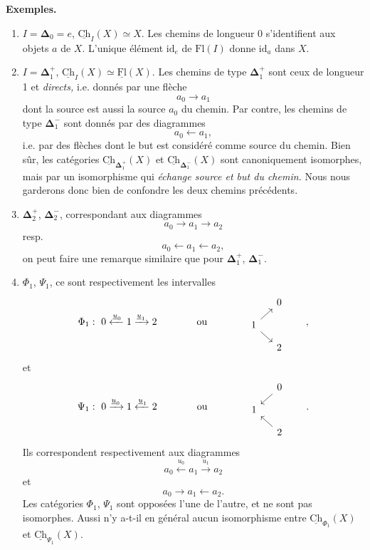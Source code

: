 \documentclass[11pt]{article}
\newcommand{\printedpage}[1]{\marginpar{\footnotesize p.~#1}}
\newcommand{\msp}[1]{\marginpar{\footnotesize [#1]}}
\newcommand{\bDelta}{\boldsymbol{\Delta}}
\newcommand{\Ch}{\underline{\mathrm{Ch}}}
\newcommand{\uFl}{\underline{\mathrm{Fl}}}
\begin{document}
\msp{page 15}

\textbf{Exemples.}

\begin{enumerate}
\item[1.] $I = \bDelta_0 = e$, $\Ch_I(X) \simeq X$. Les chemins de longueur 0 s'identifient aux objets $a$ de $X$. L'unique élément $\mathrm{id}_e$ de $\mathrm{Fl}(I)$ donne $\mathrm{id}_a$ dans $X$.

\item[2.] $I = \bDelta_1^+$, $\Ch_I(X) \simeq \uFl(X)$. Les chemins de type $\bDelta_1^+$ sont ceux de longueur 1 et \textit{directs,} i.e. donnés par une flèche
\[
a_0 \longrightarrow a_1
\]
dont la source est aussi la source $a_0$ du chemin. Par contre, les chemins de type $\bDelta_1^-$ sont donnés par des diagrammes
\[
a_0 \longleftarrow a_1,
\]
i.e. par des flèches dont le but est considéré comme source du chemin. Bien sûr, les catégories $\Ch_{\bDelta_1^+}(X)$ et $\Ch_{\bDelta_1^-}(X)$ sont canoniquement isomorphes, mais par un isomorphisme qui \textit{échange source et but du chemin.} Nous nous garderons donc bien de confondre les deux chemins précédents.

\msp{page 16}

\item[3.] $\bDelta_2^+$, $\bDelta_2^-$, correspondant aux diagrammes
\[
a_0 \longrightarrow a_1 \longrightarrow a_2
\]
resp.
\[
a_0 \longleftarrow a_1 \longleftarrow a_2,
\]
on peut faire une remarque similaire que pour $\bDelta_1^+$, $\bDelta_1^-$.

\printedpage{11}

\item[4.] $\Phi_1$, $\Psi_1$, ce sont respectivement les intervalles
\[
\Phi_1 :\ 0 \xleftarrow{\underline{u}_0} 1 \xrightarrow{\underline{u}_1} 2 \qquad\qquad \text{ou} \qquad\qquad
\begin{tikzcd}[row sep=small, column sep=small]
 & 0 \\
1 \arrow[ur] \arrow[dr] & \\
 & 2
\end{tikzcd}
\qquad , %
\]
et
\[
\Psi_1 :\ 0 \xrightarrow{\underline{u}_0} 1 \xleftarrow{\underline{u}_1} 2 \qquad\qquad \text{ou} \qquad\qquad
\begin{tikzcd}[row sep=small, column sep=small]
 & 0 \arrow[dl] \\
1 & \\
 & 2 \arrow[ul]
\end{tikzcd}
\qquad .
\]
Ils correspondent respectivement aux diagrammes
\[
a_0 \xleftarrow{u_0} a_1 \xrightarrow{u_1} a_2
\]
et
\[
a_0 \longrightarrow a_1 \longleftarrow a_2.
\]
Les catégories $\Phi_1$, $\Psi_1$ sont opposées l'une de l'autre, et ne sont pas isomorphes. Aussi n'y a-t-il en général aucun isomorphisme entre $\Ch_{\Phi_1}(X)$ et $\Ch_{\Psi_1}(X)$.
\end{enumerate}
\end{document}
